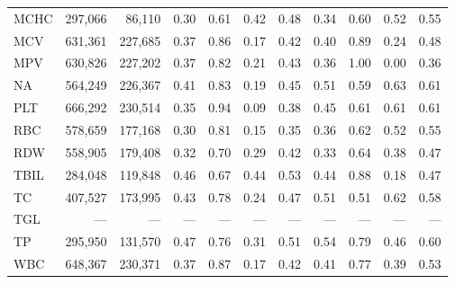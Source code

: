 \begin{table}[ht]
\begin{tabular}{lrrrrrrrrrr}
MCHC & 297,066 & 86,110 & 0.30 & 0.61 & 0.42 & 0.48 & 0.34 & 0.60 & 0.52 & 0.55 \\
MCV & 631,361 & 227,685 & 0.37 & 0.86 & 0.17 & 0.42 & 0.40 & 0.89 & 0.24 & 0.48 \\
MPV & 630,826 & 227,202 & 0.37 & 0.82 & 0.21 & 0.43 & 0.36 & 1.00 & 0.00 & 0.36 \\
NA & 564,249 & 226,367 & 0.41 & 0.83 & 0.19 & 0.45 & 0.51 & 0.59 & 0.63 & 0.61 \\
PLT & 666,292 & 230,514 & 0.35 & 0.94 & 0.09 & 0.38 & 0.45 & 0.61 & 0.61 & 0.61 \\
RBC & 578,659 & 177,168 & 0.30 & 0.81 & 0.15 & 0.35 & 0.36 & 0.62 & 0.52 & 0.55 \\
RDW & 558,905 & 179,408 & 0.32 & 0.70 & 0.29 & 0.42 & 0.33 & 0.64 & 0.38 & 0.47 \\
TBIL & 284,048 & 119,848 & 0.46 & 0.67 & 0.44 & 0.53 & 0.44 & 0.88 & 0.18 & 0.47 \\
TC & 407,527 & 173,995 & 0.43 & 0.78 & 0.24 & 0.47 & 0.51 & 0.51 & 0.62 & 0.58 \\
TGL & --- & --- & --- & --- & --- & --- & --- & --- & --- & --- \\
TP & 295,950 & 131,570 & 0.47 & 0.76 & 0.31 & 0.51 & 0.54 & 0.79 & 0.46 & 0.60 \\
WBC & 648,367 & 230,371 & 0.37 & 0.87 & 0.17 & 0.42 & 0.41 & 0.77 & 0.39 & 0.53 \\
\bottomrule
\end{tabular}
\label{tab:chs_eval_ckd}
\end{table}